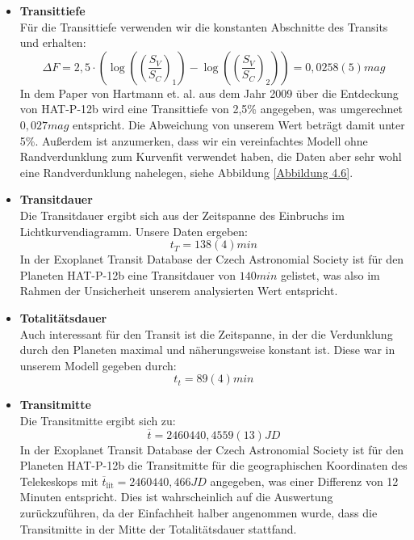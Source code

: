 \documentclass[ngerman,ruledheaders=section,class=report,thesis={type=Protokoll},accentcolor=1b,marginpar=false,parskip=half-,fontsize=11pt,]{tudapub}
\begin{document}
	\begin{itemize}
		\item \textbf{Transittiefe}\\
		Für die Transittiefe verwenden wir die konstanten Abschnitte des Transits und erhalten: 
		\begin{equation}
			\Delta F = 2,5 \cdot \left(\log\left(\left(\frac{S_V}{S_C}\right)_1\right) - \log\left(\left(\frac{S_V}{S_C}\right)_2\right)\right) = 0,0258(5) \si{mag}
		\end{equation}
		In dem Paper von Hartmann et. al. \cite{hartman2009hat} aus dem Jahr 2009 über die Entdeckung von HAT-P-12b wird eine Transittiefe von 2,5\% angegeben, was umgerechnet $0,027 \si{mag}$ entspricht. Die Abweichung von unserem Wert beträgt damit unter 5\%. Außerdem ist anzumerken, dass wir ein vereinfachtes Modell ohne Randverdunklung zum Kurvenfit verwendet haben, die Daten aber sehr wohl eine Randverdunklung nahelegen, siehe Abbildung \ref{Abbildung 4.6}.  
		\item \textbf{Transitdauer} \\
		Die Transitdauer ergibt sich aus der Zeitspanne des Einbruchs im Lichtkurvendiagramm.
		Unsere Daten ergeben: 
		\begin{equation}
			t_T = 138(4)\si{min}      
		\end{equation}
		In der \glqq Exoplanet Transit Database\grqq \cite{exoDataCzech} der Czech Astronomial Society ist für den Planeten HAT-P-12b eine Transitdauer von $140 \si{min}$ gelistet, was also im Rahmen der Unsicherheit unserem analysierten Wert entspricht. 
		\item \textbf{Totalitätsdauer}\\
		Auch interessant für den Transit ist die Zeitspanne, in der die Verdunklung durch den Planeten maximal und näherungsweise konstant ist. Diese war in unserem Modell gegeben durch:
		\begin{equation}
			t_t = 89(4) \si{min}
		\end{equation}
		\item \textbf{Transitmitte} \\
		Die Transitmitte ergibt sich zu:
		\begin{equation}
			\overline{t} = 2460440,4559(13) \si{JD}
		\end{equation}
		In der \glqq Exoplanet Transit Database\grqq \cite{exoDataCzech} der Czech Astronomial Society ist für den Planeten HAT-P-12b die Transitmitte für die geographischen Koordinaten des Telekeskops mit $\overline{t}_{\text{lit}} = 2460440,466 \si{JD}$ angegeben, was einer Differenz von 12 Minuten entspricht. Dies ist wahrscheinlich auf die Auswertung zurückzuführen, da der Einfachheit halber angenommen wurde, dass die Transitmitte in der Mitte der Totalitätsdauer stattfand. 

\end{itemize}
\end{document}
